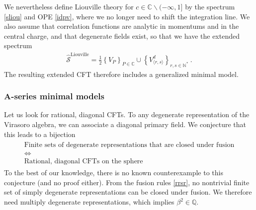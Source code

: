 \documentclass[12pt, a4paper]{article}
\theoremstyle{break}
\begin{document}
We nevertheless define Liouville theory for $c\in\mathbb{C}\backslash (-\infty,1]$ by the spectrum \eqref{sliou} and OPE \eqref{idpv}, where we no longer need to shift the integration line. 
We also assume that correlation functions are analytic in momentums and in the central charge, and that degenerate fields exist, so that we have the extended spectrum
\begin{align}
 \boxed{ \widehat{\mathcal{S}}^\text{Liouville} = \frac12 \left\{ V_P\right\}_{P\in \mathbb{C}} \cup \left\{ V^d_{\langle r,s\rangle}\right\}_{r,s\in\mathbb{N}^*} }\ .
 \label{stliou}
\end{align}
The resulting extended CFT therefore includes a generalized minimal model. 


\subsubsection{A-series minimal models}\label{sec:amm}

Let us look for rational, diagonal CFTs. 
To any degenerate representation of the Virasoro algebra, we can associate a diagonal primary field. We conjecture that this leads to a bijection 
\begin{align}
\begin{array}{c}
 \text{Finite sets of degenerate representations that are closed under fusion}
 \\
 \iff 
 \\
 \text{Rational, diagonal CFTs on the sphere}
\end{array}
\end{align}
To the best of our knowledge, there is no known counterexample to this conjecture (and no proof either). 
From the fusion rules \eqref{rrsr}, no nontrivial finite set of simply degenerate representations can be closed under fusion. We therefore need multiply degenerate representations, which implies $\beta^2\in\mathbb{Q}$.  
\end{document}
